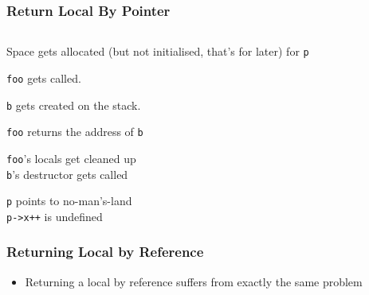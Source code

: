 \begin{frame}
  \frametitle{Return Local By Pointer}
  \begin{center}
    \begin{columns}
      \column{4cm}
      \column{4cm}
    \end{columns}
  \end{center}
  \vskip2mm
  \begin{overprint}
    \begin{center}
      Space gets allocated (but not initialised, that's for later) for {\tt p}
    \end{center}

    \begin{center}
      {\tt foo} gets called.
    \end{center}

    \begin{center}
      {\tt b} gets created on the stack.
    \end{center}

    \begin{center}
      {\tt foo} returns the address of {\tt b}
    \end{center}

    \begin{center}
      {\tt foo}'s locals get cleaned up \\
      {\tt b}'s destructor gets called
    \end{center}

    \begin{center}
      {\tt p} points to no-man's-land \\
      {\tt p->x++} is undefined
    \end{center}
  \end{overprint}
\end{frame}

\begin{frame}
  \frametitle{Returning Local by Reference}
  \begin{itemize}
    \item Returning a local by reference suffers from exactly the same problem
  \end{itemize}
\end{frame}


